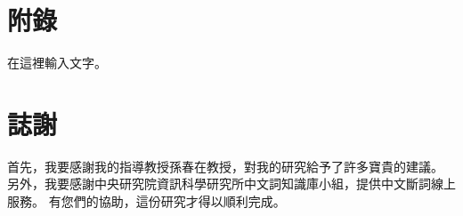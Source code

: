 \documentclass[letterpaper, 10pt, conference]{ieeeconf}   %
\begin{document}
\begin{CJK}{UTF8}{bsmi}
\section*{附錄}

在這裡輸入文字。%

\section*{誌謝}

首先，我要感謝我的指導教授孫春在教授，對我的研究給予了許多寶貴的建議。%
另外，我要感謝中央研究院資訊科學研究所中文詞知識庫小組，提供中文斷詞線上服務。%
有您們的協助，這份研究才得以順利完成。%





\end{CJK}
\end{document}
